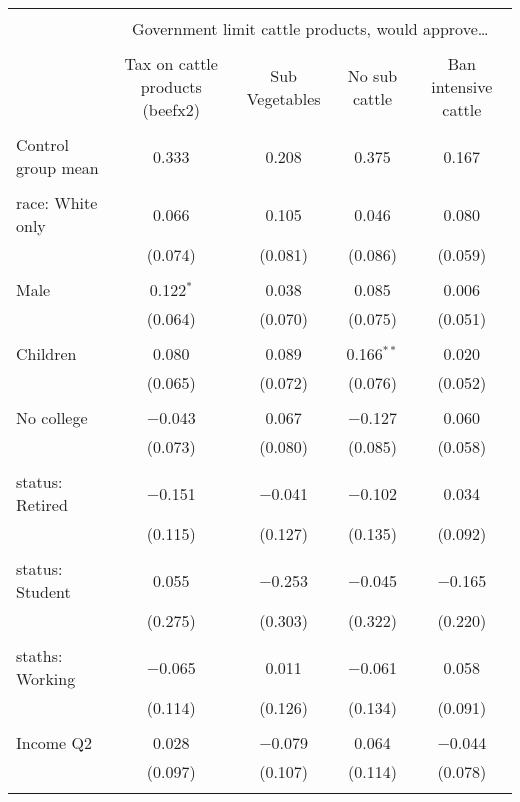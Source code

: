 
\begin{tabular}{@{\extracolsep{5pt}}lcccc} 
\\[-1.8ex]\hline 
\hline \\[-1.8ex] 
 & \multicolumn{4}{c}{Government limit cattle products, would approve…} \\ 
\cline{2-5} 
\\[-1.8ex] & Tax on cattle products (beefx2) & Sub Vegetables & No sub cattle & Ban intensive cattle \\ 
\hline \\[-1.8ex] 
 Control group mean & 0.333 & 0.208 & 0.375 & 0.167  \\ \hline \\[-1.8ex] race: White only & 0.066 & 0.105 & 0.046 & 0.080 \\ 
  & (0.074) & (0.081) & (0.086) & (0.059) \\ 
  & & & & \\ 
 Male & 0.122$^{*}$ & 0.038 & 0.085 & 0.006 \\ 
  & (0.064) & (0.070) & (0.075) & (0.051) \\ 
  & & & & \\ 
 Children & 0.080 & 0.089 & 0.166$^{**}$ & 0.020 \\ 
  & (0.065) & (0.072) & (0.076) & (0.052) \\ 
  & & & & \\ 
 No college & $-$0.043 & 0.067 & $-$0.127 & 0.060 \\ 
  & (0.073) & (0.080) & (0.085) & (0.058) \\ 
  & & & & \\ 
 status: Retired & $-$0.151 & $-$0.041 & $-$0.102 & 0.034 \\ 
  & (0.115) & (0.127) & (0.135) & (0.092) \\ 
  & & & & \\ 
 status: Student & 0.055 & $-$0.253 & $-$0.045 & $-$0.165 \\ 
  & (0.275) & (0.303) & (0.322) & (0.220) \\ 
  & & & & \\ 
 staths: Working & $-$0.065 & 0.011 & $-$0.061 & 0.058 \\ 
  & (0.114) & (0.126) & (0.134) & (0.091) \\ 
  & & & & \\ 
 Income Q2 & 0.028 & $-$0.079 & 0.064 & $-$0.044 \\ 
  & (0.097) & (0.107) & (0.114) & (0.078) \\ 
  & & & & \\ 

\end{tabular}
